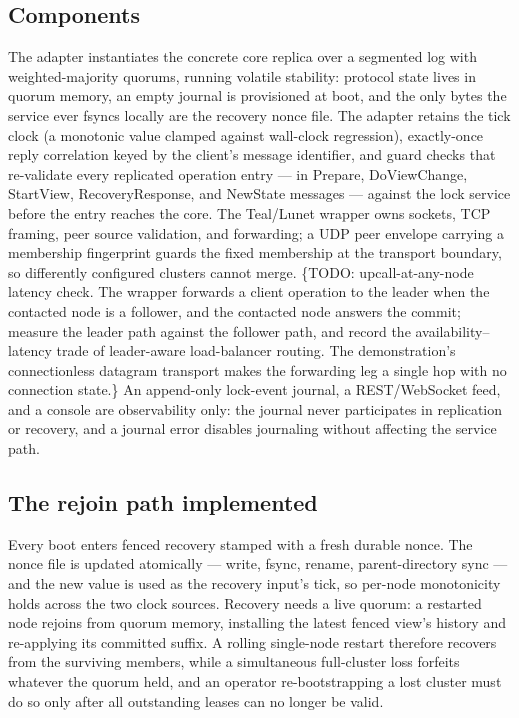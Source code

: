 \documentclass[10pt,journal,letterpaper]{IEEEtran}
\begin{document}
\subsection{Components}
The adapter instantiates the concrete core replica over a segmented log with
weighted-majority quorums, running volatile stability: protocol state lives
in quorum memory, an empty journal is provisioned at boot, and the only bytes
the service ever fsyncs locally are the recovery nonce file. The adapter
retains the tick clock (a monotonic value clamped against wall-clock
regression), exactly-once reply correlation keyed by the client's message
identifier, and guard checks that re-validate every replicated operation
entry --- in Prepare, DoViewChange, StartView, RecoveryResponse, and NewState
messages --- against the lock service before the entry reaches the core. The
Teal/Lunet wrapper owns sockets, TCP framing, peer source validation, and
forwarding; a UDP peer envelope carrying a membership fingerprint guards the
fixed membership at the transport boundary, so differently configured
clusters cannot merge.
\{TODO: upcall-at-any-node latency check. The wrapper forwards a client
operation to the leader when the contacted node is a follower, and the
contacted node answers the commit; measure the leader path against the
follower path, and record the availability--latency trade of leader-aware
load-balancer routing. The demonstration's connectionless datagram
transport makes the forwarding leg a single hop with no connection state.\} An append-only lock-event journal, a REST/WebSocket
feed, and a console are observability only: the journal never participates in
replication or recovery, and a journal error disables journaling without
affecting the service path.

\subsection{The rejoin path implemented}
Every boot enters fenced recovery stamped with a fresh durable nonce. The
nonce file is updated atomically --- write, fsync, rename, parent-directory
sync --- and the new value is used as the recovery input's tick, so
per-node monotonicity holds across the two clock sources. Recovery needs a
live quorum: a restarted node rejoins from quorum memory, installing the
latest fenced view's history and re-applying its committed suffix. A rolling
single-node restart therefore recovers from the surviving members, while a
simultaneous full-cluster loss forfeits whatever the quorum held, and an
operator re-bootstrapping a lost cluster must do so only after all
outstanding leases can no longer be valid.
\end{document}
